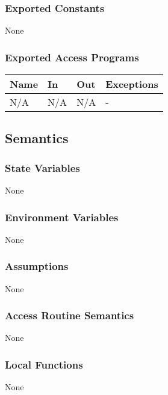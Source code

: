 \documentclass[12pt, titlepage]{article}
\begin{document}
\subsubsection{Exported Constants}

None

\subsubsection{Exported Access Programs}

\begin{center}
\begin{tabular}{p{3.5cm} p{4.5cm} p{3cm} p{2cm}}
\hline
\textbf{Name} & \textbf{In} & \textbf{Out} & \textbf{Exceptions} \\
\hline
N/A & N/A & N/A & - \\
\hline
\end{tabular}
\end{center}

\subsection{Semantics}

\subsubsection{State Variables}

None

\subsubsection{Environment Variables}

None

\subsubsection{Assumptions}

None

\subsubsection{Access Routine Semantics}

None

\subsubsection{Local Functions}

None
\end{document}

